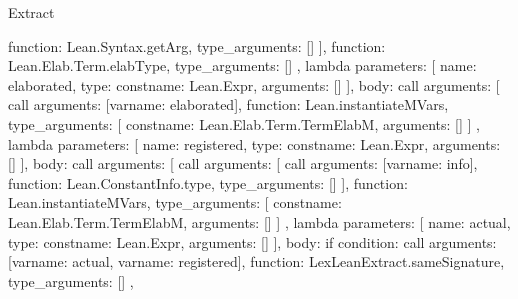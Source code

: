 \begin{lexlean}{Extract}
\begin{toolingmodule}
{{{{{{{{{{                              function: Lean.Syntax.getArg,
                              type_arguments: []
                            }
                          ],
                          function: Lean.Elab.Term.elabType,
                          type_arguments: []
                        },
                        lambda{
                          parameters: [
                            {name: elaborated, type: const{name: Lean.Expr, arguments: []}}
                          ],
                          body: call{
                            arguments: [
                              call{
                                arguments: [var{name: elaborated}],
                                function: Lean.instantiateMVars,
                                type_arguments: [
                                  const{name: Lean.Elab.Term.TermElabM, arguments: []}
                                ]
                              },
                              lambda{
                                parameters: [
                                  {name: registered, type: const{name: Lean.Expr, arguments: []}}
                                ],
                                body: call{
                                  arguments: [
                                    call{
                                      arguments: [
                                        call{
                                          arguments: [var{name: info}],
                                          function: Lean.ConstantInfo.type,
                                          type_arguments: []
                                        }
                                      ],
                                      function: Lean.instantiateMVars,
                                      type_arguments: [
                                        const{name: Lean.Elab.Term.TermElabM, arguments: []}
                                      ]
                                    },
                                    lambda{
                                      parameters: [
                                        {name: actual, type: const{name: Lean.Expr, arguments: []}}
                                      ],
                                      body: if{
                                        condition: call{
                                          arguments: [var{name: actual}, var{name: registered}],
                                          function: LexLeanExtract.sameSignature,
                                          type_arguments: []
                                        },
}}}}}}}}}}}}}}
\end{toolingmodule}
\end{lexlean}
